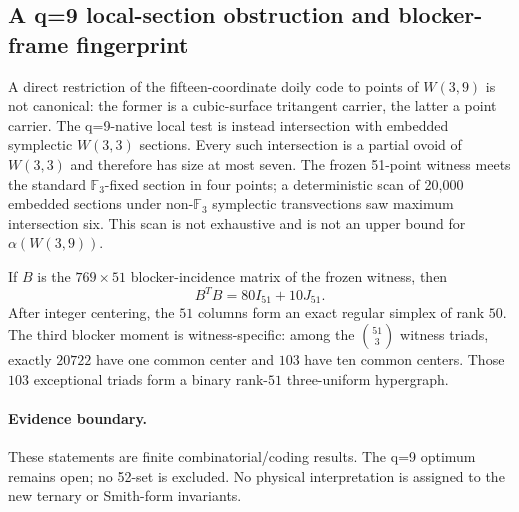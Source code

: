 \subsection{A q=9 local-section obstruction and blocker-frame fingerprint}
A direct restriction of the fifteen-coordinate doily code to points of $W(3,9)$ is not canonical: the former is a cubic-surface tritangent carrier, the latter a point carrier.  The q=9-native local test is instead intersection with embedded symplectic $W(3,3)$ sections.  Every such intersection is a partial ovoid of $W(3,3)$ and therefore has size at most seven.  The frozen 51-point witness meets the standard $\mathbb F_3$-fixed section in four points; a deterministic scan of 20,000 embedded sections under non-$\mathbb F_3$ symplectic transvections saw maximum intersection six.  This scan is not exhaustive and is not an upper bound for $\alpha(W(3,9))$.

If $B$ is the $769\times51$ blocker-incidence matrix of the frozen witness, then
\[
\boxed{B^TB=80I_{51}+10J_{51}}.
\]
After integer centering, the $51$ columns form an exact regular simplex of rank $50$.  The third blocker moment is witness-specific: among the $\binom{51}{3}$ witness triads, exactly $20722$ have one common center and $103$ have ten common centers.  Those $103$ exceptional triads form a binary rank-$51$ three-uniform hypergraph.

\paragraph{Evidence boundary.}
These statements are finite combinatorial/coding results.  The q=9 optimum remains open; no 52-set is excluded.  No physical interpretation is assigned to the new ternary or Smith-form invariants.
